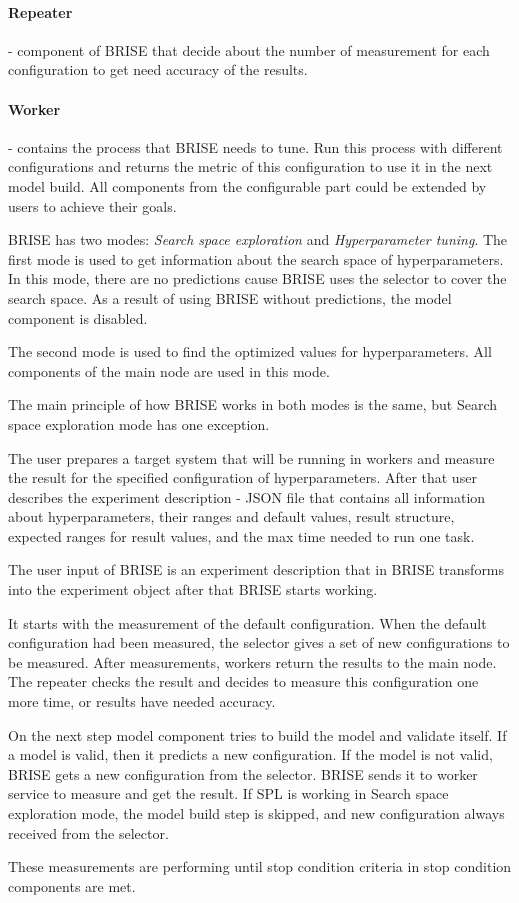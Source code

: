 \paragraph{Repeater} - component of BRISE that decide about the number of measurement for each configuration to get need accuracy of the results. 
\paragraph{Worker} - contains the process that BRISE needs to tune. Run this process with different configurations and returns the metric of this configuration to use it in the next model build.
All components from the configurable part could be extended by users to achieve their goals.

BRISE has two modes: \textit{Search space exploration} and \textit{Hyperparameter tuning}.
The first mode is used to get information about the search space of hyperparameters. In this mode, there are no predictions cause BRISE uses the selector to cover the search space. As a result of using BRISE without predictions, the model component is disabled.

The second mode is used to find the optimized values for hyperparameters. All components of the main node are used in this mode.

The main principle of how BRISE works in both modes is the same, but 
Search space exploration mode has one exception.

The user prepares a target system that will be running in workers and measure the result for the specified configuration of hyperparameters.
After that user describes the experiment description - JSON file that contains all information about hyperparameters, their ranges and default values, result structure, expected ranges for result values, and the max time needed to run one task.

The user input of BRISE is an experiment description that in BRISE transforms into the experiment object after that BRISE starts working.

It starts with the measurement of the default configuration. When the default configuration had been measured, the selector gives a set of new configurations to be measured. After measurements, workers return the results to the main node. The repeater checks the result and decides to measure this configuration one more time, or results have needed accuracy. 

On the next step model component tries to build the model and validate itself. If a model is valid, then it predicts a new configuration. If the model is not valid, BRISE gets a new configuration from the selector. BRISE sends it to worker service to measure and get the result. If SPL is working in Search space exploration mode, the model build step is skipped, and new configuration always received from the selector. 

These measurements are performing until stop condition criteria in stop condition components are met.
